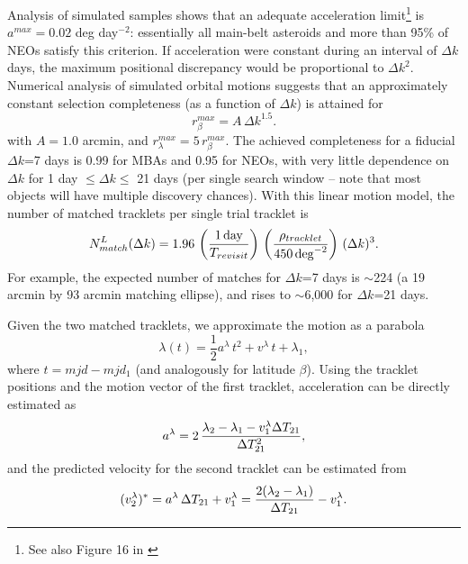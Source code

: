Analysis of simulated samples shows that an adequate acceleration limit\footnote{See also
Figure 16 in \citet{LDM-156}} is $a^{max}=0.02$ deg day$^{-2}$: essentially
all main-belt asteroids and more than 95\% of NEOs satisfy this criterion. If acceleration
were constant during an interval of $\Delta k$ days, the maximum positional discrepancy
would be proportional to $\Delta k^2$. Numerical analysis of simulated orbital motions
suggests that an approximately constant selection completeness (as a function of $\Delta k$)
is attained for
\begin{equation}
\label{eq:matching1}
                r_\beta^{max} = A \, \Delta k^{1.5}.
\end{equation}
with $A=1.0$ arcmin, and $r_\lambda^{max} = 5 \, r_\beta^{max}$. The achieved completeness for
a fiducial $\Delta k$=7 days is 0.99 for MBAs and 0.95 for NEOs, with very little dependence
on $\Delta k$ for 1 day $\le \Delta k \le$ 21 days (per single search window -- note that most
objects will have multiple discovery chances).  With this linear motion model, the number
of matched tracklets per single trial tracklet is
\begin{equation}
\label{eq:Nmdk2}
   N^{L}_{match}(\Delta k) = 1.96 \, \left({1 \, {\rm day} \over T_{revisit}}\right) \,
                    \left( \rho_{tracklet}  \over 450 \, {\rm deg}^{-2} \right) \, (\Delta k)^3.
\end{equation}
For example,  the expected number of matches for $\Delta k$=7 days is $\sim$224
(a 19 arcmin by 93 arcmin matching ellipse), and rises to $\sim$6,000 for
$\Delta k$=21 days.

Given the two matched tracklets, we approximate the motion as a parabola
\begin{equation}
\label{eq:parabola}
          \lambda(t) = \frac{1}{2}a^\lambda \, t^2 + v^\lambda \, t + \lambda_1,
\end{equation}
where $t = mjd - mjd_1$ (and analogously for latitude $\beta$).  Using the tracklet
positions and the motion vector of the first tracklet, acceleration can be directly
estimated as
\begin{equation}
 \label{eq:accPred}
             a^\lambda = 2 \, {\lambda_2- \lambda_1 - v_1^\lambda \Delta T_{21} \over \Delta T^2_{21}},
\end{equation}
and the predicted velocity for the second tracklet can be estimated from
\begin{equation}
\label{eq:v2cut}
        (v^\lambda_2)^\ast =  a^\lambda \,\Delta T_{21}  + v_1^\lambda =
      {2(\lambda_2- \lambda_1) \over \Delta T_{21}}  - v_1^\lambda.
\end{equation}

